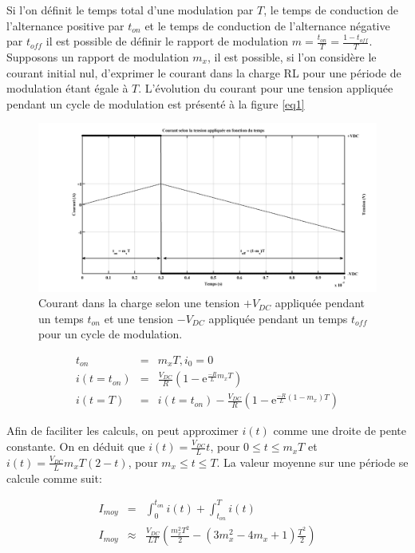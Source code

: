 \documentclass[11pt,letterpaper,final]{report}
\begin{document}
Si l'on définit le temps total d'une modulation par $T$, le temps de conduction de l'alternance positive par $t_{on}$ et le temps de conduction de l'alternance négative par $t_{off}$ il est possible de définir le rapport de modulation $m = \frac{t_{on}}{T} = \frac{1-t_{off}}{T}$. Supposons un rapport de modulation $m_x$, il est possible, si l'on considère le courant initial nul, d'exprimer le courant dans la charge RL pour une période de modulation étant égale à $T$. L'évolution du courant pour une tension appliquée pendant un cycle de modulation est présenté à la figure \ref{eq1}
\begin{figure}
\centering
\includegraphics[scale=0.4]{fig_courant_tension_mod.png}
\caption{Courant dans la charge selon une tension $+V_{DC}$ appliquée pendant un temps $t_{on}$ et une tension $-V_{DC}$ appliquée pendant un temps $t_{off}$ pour un cycle de modulation.}
\end{figure}
\begin{eqnarray}
t_{on} &=& m_x T, i_0 = 0\\
i\left(t = t_{on}\right) &=& \frac{V_{DC}}{R}\left(1 - \mbox{e}^{\frac{-R}{L}m_x T}\right)\\
i\left(t = T\right) &=& i\left(t = t_{on}\right) -  \frac{V_{DC}}{R}\left(1 - \mbox{e}^{\frac{-R}{L}(1-m_x)T}\right)
\end{eqnarray}

Afin de faciliter les calculs, on peut approximer $i(t)$ comme une droite de pente constante. On en déduit que $i(t) = \frac{V_{DC}}{L}t$, pour $0\leq t \leq m_x T$ et $i(t) = \frac{V_{DC}}{L} m_x T \left( 2 - t\right)$, pour $m_x\leq t \leq T$. La valeur moyenne sur une période se calcule comme suit:

\begin{eqnarray}
I_{moy} &=& \int_0^{t_{on}} i(t) + \int_{t_{on}}^{T} i(t)\\\label{eq_Imoy}
I_{moy} &\approx & \frac{V_{DC}}{LT}\left(\frac{m_x^2 T^2}{2} -(3m_x^2 -4m_x +1)\frac{T^2}{2}\right)
\end{eqnarray}
\end{document}
